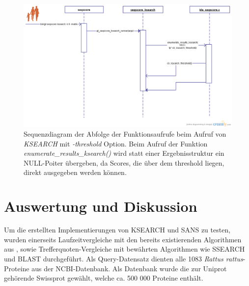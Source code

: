 \documentclass{article}
\begin{document}
\begin{center}
  \begin{figure}
    \includegraphics[width = \linewidth]{img/seqscore_sequence_fam_thresh.png}
    \caption{Sequenzdiagram der Abfolge der Funktionsaufrufe beim Aufruf von  \emph{KSEARCH} mit \emph{-threshold} Option. Beim Aufruf der Funktion \emph{enumerate\_results\_ksearch()} wird statt einer Ergebnisstruktur ein NULL-Poiter übergeben, da Scores, die über dem threshold liegen, direkt ausgegeben werden können.}
    \label{thresh}
  \end{figure}
\end{center}






\section{Auswertung und Diskussion}

Um die erstellten Implementierungen von KSEARCH und SANS zu testen, wurden einerseits Laufzeitvergleiche mit den bereits existierenden Algorithmen aus \cite{Holm}, sowie Trefferquoten-Vergleiche mit bewährten Algorithmen wie SSEARCH und BLAST durchgeführt. Als Query-Datensatz dienten alle 1083 \textit{Rattus rattus}-Proteine aus der NCBI-Datenbank. Als Datenbank wurde die zur Uniprot gehörende Swissprot gewählt, welche ca. 500 000 Proteine enthält.
\end{document}
